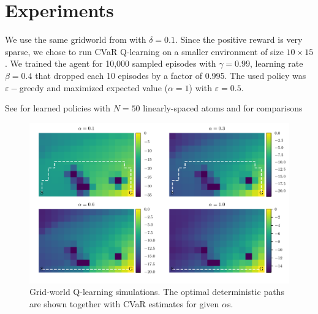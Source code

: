 
%    
%		
%	




\section{Experiments}\label{sec:qexperiments}
We use the same gridworld from  with $\delta=0.1$. Since the positive reward is very sparse, we chose to run CVaR Q-learning on a smaller environment of size $10\times15$. We trained the agent for 10,000 sampled episodes with $\gamma=0.99$, learning rate $\beta=0.4$ that dropped each 10 episodes by a factor of 0.995. The used policy was $\varepsilon-$greedy and maximized expected value ($\alpha=1$) with $\varepsilon=0.5$.

See  for learned policies with $N=50$ linearly-spaced atoms and  for comparisons 

\begin{figure}[h]
\center
\includegraphics[width=\linewidth]{gfx/q_optimal_paths.pdf}
\caption{Grid-world Q-learning simulations. The optimal deterministic paths are shown together with CVaR estimates for given $\alpha$s.}
\label{fig:qgrid}
\end{figure}


